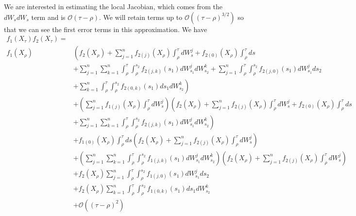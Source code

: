\documentclass[12pt]{article}
\begin{document}
We are interested in estimating the local Jacobian, which comes from the $dW_s dW_s$ term and is $\mathcal{O} (\tau - \rho)$.
%
We will retain terms up to $\mathcal{O} ((\tau - \rho)^{3/2})$ so that we can see the first error terms in this approximation. 
%
We have
\begin{equation}
\begin{aligned}
f_1(X_\tau) f_2(X_\tau) = & \\
 f_1(X_\rho) & \left( f_2(X_\rho) 
 + \sum_{j=1}^n f_{2(j)} (X_\rho) \int_\rho^\tau dW_s^j 
  + f_{2(0)} (X_\rho) \int_\rho^\tau ds \right. \\
& + \sum_{j=1}^n \sum_{k=1}^n \int_\rho^\tau \int_\rho^{s_2} f_{2(j,k)} (s_1) dW_{s_1}^j dW_{s_2}^k 
 + \sum_{j=1}^n \int_\rho^\tau \int_\rho^{s_2} f_{2(j,0)} (s_1) dW_{s_1}^j ds_2 \\
& \left. + \sum_{k=1}^n \int_\rho^\tau \int_\rho^{s_2} f_{2(0,k)} (s_1) ds_1 dW_{s_2}^k  \right) \\
& + \left( \sum_{j=1}^n f_{1(j)} (X_\rho) \int_\rho^\tau dW_s^j  \right) 
  \left( f_2(X_\rho) 
 + \sum_{j=1}^n f_{2(j)} (X_\rho) \int_\rho^\tau dW_s^j 
  + f_{2(0)} (X_\rho) \int_\rho^\tau ds \right. \\
& \left. + \sum_{j=1}^n \sum_{k=1}^n \int_\rho^\tau \int_\rho^{s_2} f_{2(j,k)} (s_1) dW_{s_1}^j dW_{s_2}^k  \right) \\
& + f_{1(0)} (X_\rho) \int_\rho^\tau ds 
  \left( f_2(X_\rho) 
 + \sum_{j=1}^n f_{2(j)} (X_\rho) \int_\rho^\tau dW_s^j  \right) \\
&+ \left( \sum_{j=1}^n \sum_{k=1}^n \int_\rho^\tau \int_\rho^{s_2} f_{1(j,k)} (s_1) dW_{s_1}^j dW_{s_2}^k  \right)
 \left( f_2(X_\rho) + \sum_{j=1}^n f_{2(j)} (X_\rho) \int_\rho^\tau dW_s^j \right)\\
& + f_2(X_\rho) \sum_{j=1}^n \int_\rho^\tau \int_\rho^{s_2} f_{1(j,0)} (s_1) dW_{s_1}^j ds_2 \\
& + f_2(X_\rho) \sum_{k=1}^n \int_\rho^\tau \int_\rho^{s_2} f_{1(0,k)} (s_1) ds_1 dW_{s_2}^k \\
&+ \mathcal{O} ((\tau - \rho)^2 ) 
\end{aligned}
\end{equation}
\end{document}
